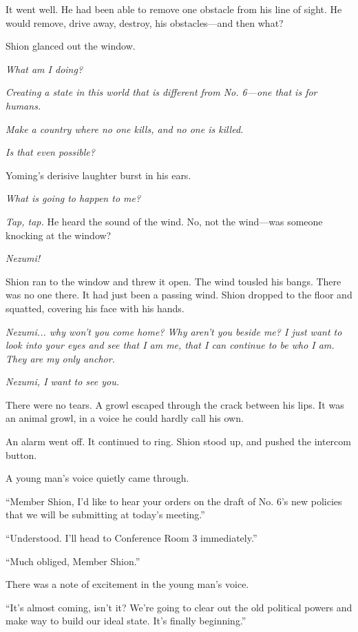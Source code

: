 It went well. He had been able to remove one obstacle from his line of
sight. He would remove, drive away, destroy, his obstacles---and then
what?

Shion glanced out the window.

\emph{What am I doing?}

\emph{Creating a state in this world that is different from No. 6---one that is
for humans.}

\emph{Make a country where no one kills, and no one is killed.}

\emph{Is that even possible?}

Yoming's derisive laughter burst in his ears.

\emph{What is going to happen to me?}

\myspace

\emph{Tap, tap.} He heard the sound of the wind. No, not the wind---was someone
knocking at the window?

\emph{Nezumi!}

Shion ran to the window and threw it open. The wind tousled his bangs.
There was no one there. It had just been a passing wind. Shion dropped
to the floor and squatted, covering his face with his hands.

\emph{Nezumi... why won't you come home? Why aren't you beside me? I just want
to look into your eyes and see that I am me, that I can continue to be
who I am. They are my only anchor.}

\emph{Nezumi, I want to see you.}

There were no tears. A growl escaped through the crack between his lips.
It was an animal growl, in a voice he could hardly call his own.

An alarm went off. It continued to ring. Shion stood up, and
pushed the intercom button.

A young man's voice quietly came through.

``Member Shion, I'd like to hear your orders on the draft of No. 6's new
policies that we will be submitting at today's meeting.''

``Understood. I'll head to Conference Room 3 immediately.''

``Much obliged, Member Shion.''

There was a note of excitement in the young man's voice.

``It's almost coming, isn't it? We're going to clear out the old
political powers and make way to build our ideal state. It's finally
beginning.''

